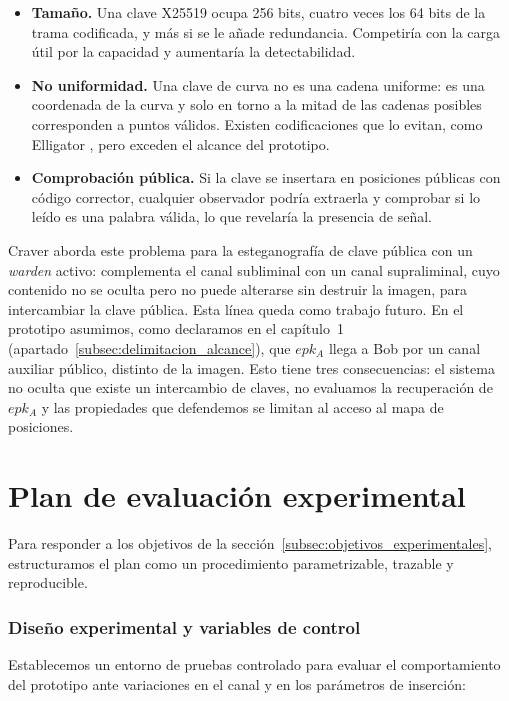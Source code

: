 \documentclass[IB]{TFUOC}%
\begin{document}
\begin{itemize}
    \item \textbf{Tamaño.} Una clave X25519 ocupa 256 bits, cuatro veces los 64 bits de la trama codificada, y más si se le añade redundancia. Competiría con la carga útil por la capacidad y aumentaría la detectabilidad.
    \item \textbf{No uniformidad.} Una clave de curva no es una cadena uniforme: es una coordenada de la curva y solo en torno a la mitad de las cadenas posibles corresponden a puntos válidos. Existen codificaciones que lo evitan, como Elligator \cite{bernstein2013elligator}, pero exceden el alcance del prototipo.
    \item \textbf{Comprobación pública.} Si la clave se insertara en posiciones públicas con código corrector, cualquier observador podría extraerla y comprobar si lo leído es una palabra válida, lo que revelaría la presencia de señal.
\end{itemize}

Craver \cite{craver1998} aborda este problema para la esteganografía de clave pública con un \textit{warden} activo: complementa el canal subliminal con un canal supraliminal, cuyo contenido no se oculta pero no puede alterarse sin destruir la imagen, para intercambiar la clave pública. Esta línea queda como trabajo futuro. En el prototipo asumimos, como declaramos en el capítulo~1 (apartado~\ref{subsec:delimitacion_alcance}), que $epk_A$ llega a Bob por un canal auxiliar público, distinto de la imagen. Esto tiene tres consecuencias: el sistema no oculta que existe un intercambio de claves, no evaluamos la recuperación de $epk_A$ y las propiedades que defendemos se limitan al acceso al mapa de posiciones.

\section{Plan de evaluación experimental}
\label{subsec:plan_experimental}

Para responder a los objetivos de la sección~\ref{subsec:objetivos_experimentales}, estructuramos el plan como un procedimiento parametrizable, trazable y reproducible.

\subsubsection{Diseño experimental y variables de control}

Establecemos un entorno de pruebas controlado para evaluar el comportamiento del prototipo ante variaciones en el canal y en los parámetros de inserción:
\end{document}
